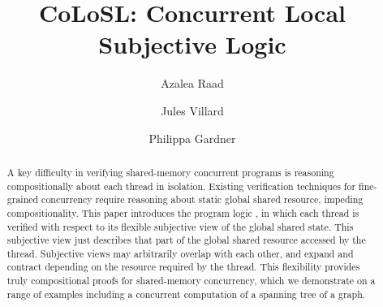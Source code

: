 \documentclass[runningheads,a4paper]{llncs}
\begin{document}
%
\title{CoLoSL: Concurrent Local Subjective Logic}
\author{Azalea Raad\and Jules Villard\and Philippa Gardner}

\maketitle

\begin{abstract}
A key difficulty in verifying shared-memory concurrent programs is
reasoning compositionally about each thread in isolation. Existing
verification techniques for fine-grained concurrency require 
reasoning about static global shared resource, impeding compositionality.  This
paper introduces the program logic \colosl, in which each thread is
verified with respect to its flexible subjective view of the global
shared state.
This subjective view  just describes  that part of the global shared resource accessed by the
thread. Subjective views may arbitrarily overlap with each other, and
expand and contract depending on the resource required by the thread.
This flexibility provides truly compositional proofs for shared-memory
concurrency, which we demonstrate on a range of examples including a
concurrent computation of a spanning tree of a graph.
\end{abstract}

%
%

%
%

\newpage
%
%
\end{document}
